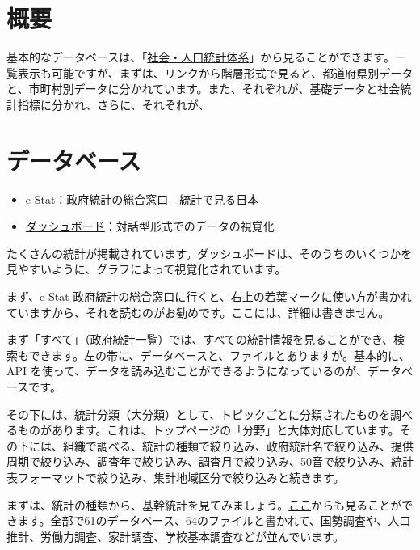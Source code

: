 \documentclass[
  xelatex, ja=standard]{bxjsbook}
\providecommand{\tightlist}{%
  \setlength{\itemsep}{0pt}\setlength{\parskip}{0pt}}
\theoremstyle{definition}
\theoremstyle{definition}
\theoremstyle{definition}
\theoremstyle{definition}
\theoremstyle{remark}
\begin{document}
\hypertarget{ux6982ux8981-6}{%
\section{概要}\label{ux6982ux8981-6}}

基本的なデータベースは、「\href{https://www.e-stat.go.jp/stat-search/database?page=1\&layout=normal\&toukei=00200502}{社会・人口統計体系}」から見ることができます。一覧表示も可能ですが、まずは、リンクから階層形式で見ると、都道府県別データと、市町村別データに分かれています。また、それぞれが、基礎データと社会統計指標に分かれ、さらに、それぞれが、

\hypertarget{ux30c7ux30fcux30bfux30d9ux30fcux30b9-4}{%
\section{データベース}\label{ux30c7ux30fcux30bfux30d9ux30fcux30b9-4}}

\begin{itemize}
\tightlist
\item
  \href{https://www.e-stat.go.jp/}{e-Stat}：政府統計の総合窓口 - 統計で見る日本
\item
  \href{https://dashboard.e-stat.go.jp}{ダッシュボード}：対話型形式でのデータの視覚化
\end{itemize}

たくさんの統計が掲載されています。ダッシュボードは、そのうちのいくつかを見やすいように、グラフによって視覚化されています。

まず、\href{https://www.e-stat.go.jp/}{e-Stat} 政府統計の総合窓口に行くと、右上の若葉マークに使い方が書かれていますから、それを読むのがお勧めです。ここには、詳細は書きません。

まず「\href{https://www.e-stat.go.jp/stat-search?page=1}{すべて}」（政府統計一覧）では、すべての統計情報を見ることができ、検索もできます。左の帯に、データベースと、ファイルとありますが。基本的に、API を使って、データを読み込むことができるようになっているのが、データベースです。

その下には、統計分類（大分類）として、トピックごとに分類されたものを調べるものがあります。これは、トップページの「分野」と大体対応しています。その下には、組織で調べる、統計の種類で絞り込み、政府統計名で絞り込み、提供周期で絞り込み、調査年で絞り込み、調査月で絞り込み、50音で絞り込み、統計表フォーマットで絞り込み、集計地域区分で絞り込みと続きます。

まずは、統計の種類から、基幹統計を見てみましょう。\href{https://www.e-stat.go.jp/stat-search?page=1\&toukei_kind=6\&metadata=1\&data=1}{ここ}からも見ることができます。全部で61のデータベース、64のファイルと書かれて、国勢調査や、人口推計、労働力調査、家計調査、学校基本調査などが並んでいます。
\end{document}
